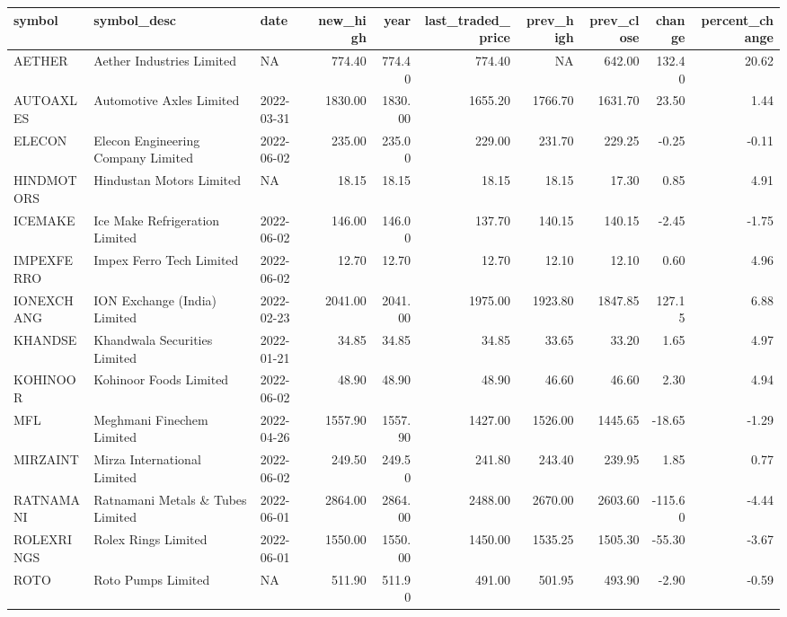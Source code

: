 \documentclass[
]{article}
\begin{document}
\begin{table}
\centering\begingroup\fontsize{12}{14}\selectfont

\begin{tabular}{l|l|l|r|r|r|r|r|r|r}
\hline
symbol & symbol\_desc & date & new\_high & year & last\_traded\_price & prev\_high & prev\_close & change & percent\_change\\
\hline
AETHER & Aether Industries Limited & NA & 774.40 & 774.40 & 774.40 & NA & 642.00 & 132.40 & 20.62\\
\hline
AUTOAXLES & Automotive Axles Limited & 2022-03-31 & 1830.00 & 1830.00 & 1655.20 & 1766.70 & 1631.70 & 23.50 & 1.44\\
\hline
ELECON & Elecon Engineering Company Limited & 2022-06-02 & 235.00 & 235.00 & 229.00 & 231.70 & 229.25 & -0.25 & -0.11\\
\hline
HINDMOTORS & Hindustan Motors Limited & NA & 18.15 & 18.15 & 18.15 & 18.15 & 17.30 & 0.85 & 4.91\\
\hline
ICEMAKE & Ice Make Refrigeration Limited & 2022-06-02 & 146.00 & 146.00 & 137.70 & 140.15 & 140.15 & -2.45 & -1.75\\
\hline
IMPEXFERRO & Impex Ferro Tech Limited & 2022-06-02 & 12.70 & 12.70 & 12.70 & 12.10 & 12.10 & 0.60 & 4.96\\
\hline
IONEXCHANG & ION Exchange (India) Limited & 2022-02-23 & 2041.00 & 2041.00 & 1975.00 & 1923.80 & 1847.85 & 127.15 & 6.88\\
\hline
KHANDSE & Khandwala Securities Limited & 2022-01-21 & 34.85 & 34.85 & 34.85 & 33.65 & 33.20 & 1.65 & 4.97\\
\hline
KOHINOOR & Kohinoor Foods Limited & 2022-06-02 & 48.90 & 48.90 & 48.90 & 46.60 & 46.60 & 2.30 & 4.94\\
\hline
MFL & Meghmani Finechem Limited & 2022-04-26 & 1557.90 & 1557.90 & 1427.00 & 1526.00 & 1445.65 & -18.65 & -1.29\\
\hline
MIRZAINT & Mirza International Limited & 2022-06-02 & 249.50 & 249.50 & 241.80 & 243.40 & 239.95 & 1.85 & 0.77\\
\hline
RATNAMANI & Ratnamani Metals \& Tubes Limited & 2022-06-01 & 2864.00 & 2864.00 & 2488.00 & 2670.00 & 2603.60 & -115.60 & -4.44\\
\hline
ROLEXRINGS & Rolex Rings Limited & 2022-06-01 & 1550.00 & 1550.00 & 1450.00 & 1535.25 & 1505.30 & -55.30 & -3.67\\
\hline
ROTO & Roto Pumps Limited & NA & 511.90 & 511.90 & 491.00 & 501.95 & 493.90 & -2.90 & -0.59\\

\end{tabular}
\end{table}
\end{document}

